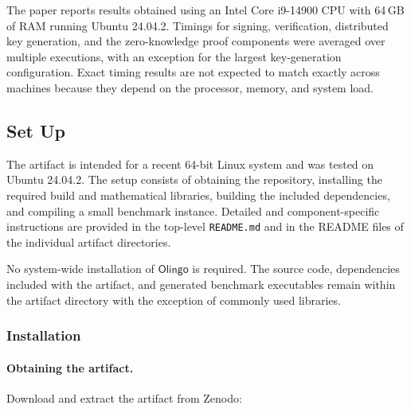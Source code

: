 \documentclass[nonacm,sigconf]{acmart}
\begin{document}
The paper reports results obtained using an Intel Core i9-14900 CPU with 64\,GB of RAM running Ubuntu 24.04.2. Timings for signing, verification, distributed key generation, and the zero-knowledge proof components were averaged over multiple executions, with an exception for the largest key-generation configuration. Exact timing results are not expected to match exactly across machines because they depend on the processor, memory, and system load.



\subsection{Set Up}


The artifact is intended for a recent 64-bit Linux system and was tested on Ubuntu 24.04.2. The setup consists of obtaining the repository, installing the required build and mathematical libraries, building the included dependencies, and compiling a small benchmark instance. Detailed and component-specific instructions are provided in the top-level \texttt{README.md} and in the README files of the individual artifact directories.

No system-wide installation of $\mathsf{Olingo}$ is required. The source code, dependencies included with the artifact, and generated benchmark executables remain within the artifact directory with the exception of commonly used libraries.

\subsubsection{Installation}



\paragraph{Obtaining the artifact.} Download and extract the artifact from Zenodo:
\end{document}
